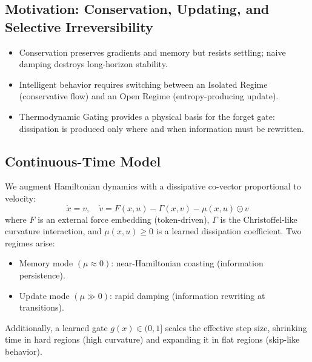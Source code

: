 \documentclass{article}
\numberwithin{equation}{section}
\begin{document}
\subsection{Motivation: Conservation, Updating, and Selective Irreversibility}
\begin{itemize}
\item Conservation preserves gradients and memory but resists settling; naive damping destroys long-horizon stability.
\item Intelligent behavior requires switching between an Isolated Regime (conservative flow) and an Open Regime (entropy-producing update).
\item Thermodynamic Gating provides a physical basis for the forget gate: dissipation is produced only where and when information must be rewritten.
\end{itemize}

\subsection{Continuous-Time Model}
We augment Hamiltonian dynamics with a dissipative co-vector proportional to velocity:
\[
\dot{x} = v, \quad \dot{v} = F(x,u) - \Gamma(x,v) - \mu(x,u)\odot v
\]
where $F$ is an external force embedding (token-driven), $\Gamma$ is the Christoffel-like curvature interaction, and $\mu(x,u) \ge 0$ is a learned dissipation coefficient. Two regimes arise:
\begin{itemize}
\item Memory mode $(\mu \approx 0)$: near-Hamiltonian coasting (information persistence).
\item Update mode $(\mu \gg 0)$: rapid damping (information rewriting at transitions).
\end{itemize}
Additionally, a learned gate $g(x)\in(0,1]$ scales the effective step size, shrinking time in hard regions (high curvature) and expanding it in flat regions (skip-like behavior).
\end{document}
